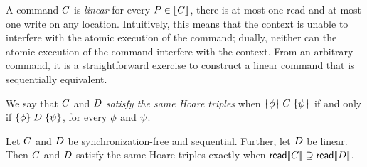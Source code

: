 A command $C$ is \emph{linear} for every $P\in\llbracket C\rrbracket$, there is
at most one read and at most one write on any location.  Intuitively, this
means that the context is unable to interfere with the atomic execution of
the command; dually, neither can the atomic execution of the command
interfere with the context.  From an arbitrary command, it is a
straightforward exercise to construct a linear command that is sequentially
equivalent.

We say that $C$ and $D$ \emph{satisfy the same Hoare triples} when
$\{\phi\}\allowbreak\;C\;\allowbreak\{\psi\}$ if and only if
$\{\phi\}\allowbreak\;D\;\allowbreak\{\psi\}$, for every $\phi$ and $\psi$.

\begin{corollary}\label{seqcompleteness}
  Let $C$ and $D$ be synchronization-free and sequential.  Further,
  let $D$ be linear.  Then $C$ and $D$ satisfy the same Hoare
  triples exactly when $\mathsf{read}\llbracket C\rrbracket \supseteq \mathsf{read}\llbracket D\rrbracket$.
%    
\end{corollary}




